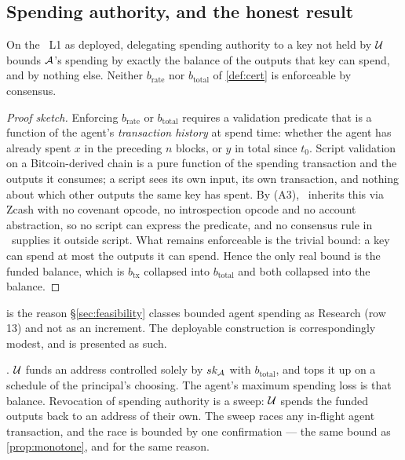 \subsection{Spending authority, and the honest result}
\label{sec:agent-identity:spend}

\begin{proposition}
\label{prop:budget-balance}
On the \Flux\ L1 as deployed, delegating spending authority to a key not held by $\mathcal{U}$ bounds
$\mathcal{A}$'s spending by exactly the balance of the outputs that key can spend, and by nothing else.
Neither $b_{\mathrm{rate}}$ nor $b_{\mathrm{total}}$ of \cref{def:cert} is enforceable by consensus.
\end{proposition}

\begin{proof}[Proof sketch]
Enforcing $b_{\mathrm{rate}}$ or $b_{\mathrm{total}}$ requires a validation predicate that is a
function of the agent's \emph{transaction history} at spend time: whether the agent has already spent
$x$ in the preceding $n$ blocks, or $y$ in total since $t_0$. Script validation on a Bitcoin-derived
chain is a pure function of the spending transaction and the outputs it consumes; a script sees its
own input, its own transaction, and nothing about which other outputs the same key has spent. By
(A3), \Flux\ inherits this via Zcash with no covenant opcode, no introspection opcode and no account
abstraction, so no script can express the predicate, and no consensus rule in \fluxd\ supplies it
outside script. What remains enforceable is the trivial bound: a key can spend at most the outputs it
can spend. Hence the only real bound is the funded balance, which is $b_{\mathrm{tx}}$ collapsed into
$b_{\mathrm{total}}$ and both collapsed into the balance. \qedhere
\end{proof}

 is the reason \S\ref{sec:feasibility} classes bounded agent spending as Research (row 13) and
not as an increment. The deployable construction is correspondingly modest, and is presented as such.

\begin{construction}
\label{con:allowance}
\planned. $\mathcal{U}$ funds an address controlled solely by $sk_{\mathcal{A}}$ with $b_{\mathrm{total}}$,
and tops it up on a schedule of the principal's choosing. The agent's maximum spending loss is that
balance. Revocation of spending authority is a sweep: $\mathcal{U}$ spends the funded outputs back to
an address of their own. The sweep races any in-flight agent transaction, and the race is bounded by
one confirmation --- the same bound as \cref{prop:monotone}, and for the same reason.
\end{construction}

